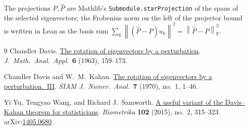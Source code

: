 \documentclass[11pt]{article}
\newcommand{\norm}[1]{\left\lVert #1\right\rVert}
\newcommand{\F}{\mathrm{F}}
\theoremstyle{remark}
\begin{document}
The projections $P,\widehat P$ are Mathlib's \texttt{Submodule.starProjection}
of the spans of the selected eigenvectors; the Frobenius norm on the left of the
projector bound is written in Lean as the basis sum
$\sum_k\norm{(\widehat P-P)u_k}^2=\norm{\widehat P-P}_{\F}^2$.

\begin{thebibliography}{9}
Chandler Davis.
\newblock \href{https://doi.org/10.1016/0022-247X(63)90001-5}{The rotation of eigenvectors by a perturbation}.
\newblock \emph{J.\ Math.\ Anal.\ Appl.}\ \textbf{6} (1963), 159--173.

Chandler Davis and W.\ M.\ Kahan.
\newblock \href{https://doi.org/10.1137/0707001}{The rotation of eigenvectors by a perturbation.\ III}.
\newblock \emph{SIAM J.\ Numer.\ Anal.}\ \textbf{7} (1970), no.\ 1, 1--46.

Yi Yu, Tengyao Wang, and Richard J.\ Samworth.
\newblock \href{https://doi.org/10.1093/biomet/asv008}{A useful variant of the Davis--Kahan theorem for statisticians}.
\newblock \emph{Biometrika} \textbf{102} (2015), no.\ 2, 315--323.
\newblock arXiv:\href{https://arxiv.org/abs/1405.0680}{1405.0680}.
\end{thebibliography}
\end{document}
